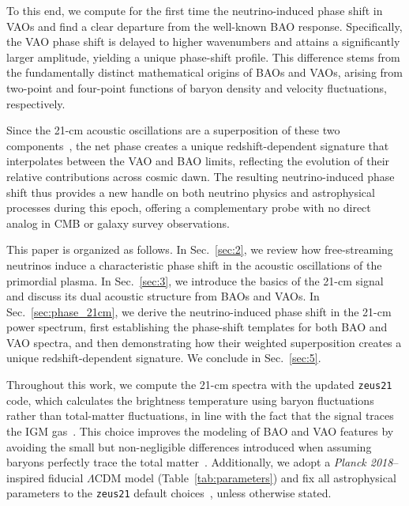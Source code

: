 \documentclass[floats,floatfix,showpacs,amssymb,prd,twocolumn,superscriptaddress,nofootinbib,reprint,preprintnumbers]{revtex4-2}
\begin{document}
To this end, we compute for the first time the neutrino-induced phase shift in VAOs and find a clear departure from the well-known BAO response. Specifically, the VAO phase shift is delayed to higher wavenumbers and attains a significantly larger amplitude, yielding a unique phase-shift profile. This difference stems from the fundamentally distinct mathematical origins of BAOs and VAOs, arising from two-point
and four-point functions of baryon density and velocity
fluctuations, respectively. 


Since the 21-cm acoustic oscillations are a superposition of these two components~\citep{cruz25}, the net phase creates a unique redshift-dependent signature that interpolates between the VAO and BAO limits, reflecting the evolution of their relative contributions across cosmic dawn. The resulting neutrino-induced phase shift thus provides a new handle on both neutrino physics and astrophysical processes during this epoch, offering a complementary probe with no direct analog in CMB or galaxy survey observations.

This paper is organized as follows. In Sec.~\ref{sec:2}, we review how free-streaming neutrinos induce a characteristic phase shift in the acoustic oscillations of the primordial plasma. In Sec.~\ref{sec:3},  we introduce the basics of the 21-cm signal and discuss its dual acoustic structure  from BAOs and VAOs. In Sec.~\ref{sec:phase_21cm}, we derive the neutrino-induced phase shift in the 21-cm power spectrum, first establishing the phase-shift templates for both BAO and VAO spectra, and then demonstrating how their weighted superposition creates a unique redshift-dependent signature. We conclude in Sec.~\ref{sec:5}.

Throughout this work, we compute the 21-cm spectra with the updated \texttt{zeus21}~\cite{munoz23,munoz23b,cruz24,cruz25} code, which calculates the brightness temperature using baryon fluctuations rather than total-matter fluctuations, in line with the fact that the signal traces the IGM gas~\cite{Furlanetto:2006jb, Pritchard:2008da, Pritchard:2010pa, pritchard12,Flitter:2024eay}. This choice improves the modeling of BAO and VAO features by avoiding the small but non-negligible differences introduced when assuming baryons perfectly trace the total matter~\cite{cruz25}. Additionally, we adopt a {\it Planck 2018}–inspired fiducial $\Lambda$CDM model (Table~\ref{tab:parameters}) and fix all astrophysical parameters to the \texttt{zeus21} default choices~\cite{cruz24}, unless otherwise stated.
\end{document}
